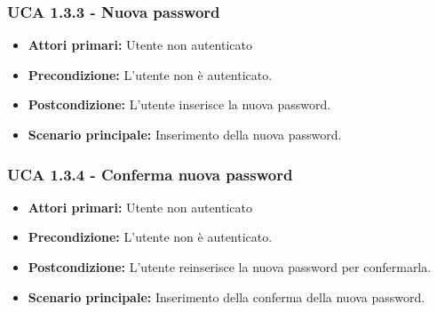 \subsubsection{UCA 1.3.3 - Nuova password}
\begin{itemize}
\item \textbf{Attori primari:} Utente non autenticato
\item \textbf{Precondizione:}  L'utente non è autenticato.
\item \textbf{Postcondizione:} L'utente inserisce la nuova password.
\item \textbf{Scenario principale:} Inserimento della nuova password.
\end{itemize}

\subsubsection{UCA 1.3.4 - Conferma nuova password}
\begin{itemize}
\item \textbf{Attori primari:} Utente non autenticato
\item \textbf{Precondizione:} L'utente non è autenticato.
\item \textbf{Postcondizione:} L'utente reinserisce la nuova password per confermarla.
\item \textbf{Scenario principale:} Inserimento della conferma della nuova password.
\end{itemize}